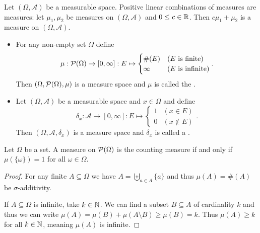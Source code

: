 \begin{lemma} \label{measuresPositiveLinear}
Let $(\Omega,\mathcal{A})$ be a measurable space. Positive linear combinations of measures are measures: let $\mu_1,\mu_2$ be measures on $(\Omega,\mathcal{A})$ and $0 \leq c \in \mathbb{R}$. Then $c\mu_1 + \mu_2$ is a measure on $(\Omega,\mathcal{A})$.
\end{lemma}

\begin{example}
\begin{itemize}
\item For any non-empty set $\Omega$ define
\[ \mu: \operatorname{\mathcal{P}}(\Omega)\to [0,\infty]: E\mapsto \begin{cases}
\#(E) & \text{($E$ is finite)} \\
\infty & \text{($E$ is infinite)}
\end{cases}. \]
Then $(\Omega, \operatorname{\mathcal{P}}(\Omega),\mu)$ is a measure space and $\mu$ is called the .
\item Let $(\Omega,\mathcal{A})$ be a measurable space and $x\in\Omega$ and define
\[ \delta_x: \mathcal{A}\to [0,\infty]: E\mapsto \begin{cases}
1 & (x\in E) \\ 0 & (x\notin E)
\end{cases}. \]
Then $(\Omega,\mathcal{A},\delta_x)$ is a measure space and $\delta_x$ is called a .
\end{itemize}
\end{example}

\begin{lemma} \label{countingMeasureCriterion}
Let $\Omega$ be a set. A measure on $\operatorname{\mathcal{P}}(\Omega)$ is the counting measure \textup{if and only if} $\mu(\{\omega\}) = 1$ for all $\omega\in\Omega$.
\end{lemma}
\begin{proof}
For any finite $A\subseteq \Omega$ we have $A = \biguplus_{a\in A}\{a\}$ and thus $\mu(A) = \#(A)$ be $\sigma$-additivity.

If $A\subseteq \Omega$ is infinite, take $k\in \mathbb{N}$. We can find a subset $B\subseteq A$ of cardinality $k$ and thus we can write $\mu(A) = \mu(B) + \mu(A\setminus B) \geq \mu(B) = k$. Thus $\mu(A) \geq k$ for all $k\in \mathbb{N}$, meaning $\mu(A)$ is infinite.
\end{proof}

